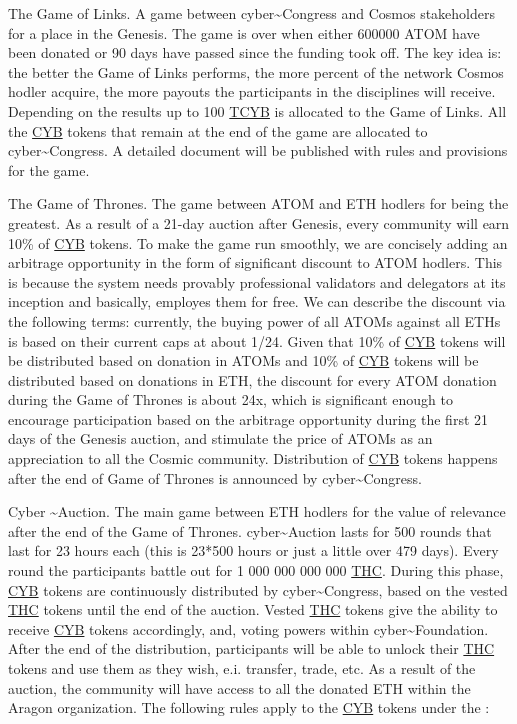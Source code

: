 \documentclass[8pt,oneside]{amsart}
\newcommand{\linkgreen}[2]{\href{#1}{\color{green}{#2}}}
\begin{document}
The Game of Links. A game between cyber\~{}Congress and Cosmos stakeholders for a place in the Genesis. The game is over when either 600000 ATOM have been donated or 90 days have passed since the funding took off. The key idea is: the better the Game of Links performs, the more percent of the network Cosmos hodler acquire, the more payouts the participants in the disciplines will receive. Depending on the results up to 100 {\hyperref[cyb]{TCYB}} is allocated to the Game of Links. All the {\hyperref[cyb]{CYB}} tokens that remain at the end of the game are allocated to cyber\~{}Congress. A detailed document will be published with rules and provisions for the game.

The Game of Thrones. The game between ATOM and ETH hodlers for being the greatest. As a result of a 21-day auction after Genesis, every community will earn 10\% of {\hyperref[cyb]{CYB}} tokens. To make the game run smoothly, we are concisely adding an arbitrage opportunity in the form of significant discount to ATOM hodlers. This is because the system needs provably professional validators and delegators at its inception and basically, employes them for free. We can describe the discount via the following terms: currently, the buying power of all ATOMs against all ETHs is based on their current caps at about 1/24. Given that 10\% of {\hyperref[cyb]{CYB}} tokens will be distributed based on donation in ATOMs and 10\% of {\hyperref[cyb]{CYB}} tokens will be distributed based on donations in ETH, the discount for every ATOM donation during the Game of Thrones is about 24x, which is significant enough to encourage participation based on the arbitrage opportunity during the first 21 days of the Genesis auction, and stimulate the price of ATOMs as an appreciation to all the Cosmic community. Distribution of {\hyperref[cyb]{CYB}} tokens happens after the end of Game of Thrones is announced by cyber\~{}Congress.

Cyber \~{}Auction. The main game between ETH hodlers for the value of relevance after the end of the Game of Thrones. cyber\~{}Auction lasts for 500 rounds that last for 23 hours each (this is 23*500 hours or just a little over 479 days). Every round the participants battle out for 1 000 000 000 000 {\hyperref[thc]{THC}}. During this phase, {\hyperref[cyb]{CYB}} tokens are continuously distributed by cyber\~{}Congress, based on the vested {\hyperref[thc]{THC}} tokens until the end of the auction. Vested {\hyperref[thc]{THC}} tokens give the ability to receive {\hyperref[cyb]{CYB}} tokens accordingly, and, voting powers within cyber\~{}Foundation. After the end of the distribution, participants will be able to unlock their {\hyperref[thc]{THC}} tokens and use them as they wish, e.i. transfer, trade, etc. As a result of the auction, the community will have access to all the donated ETH within the Aragon organization. The following rules apply to the {\hyperref[cyb]{CYB}} tokens under the \linkgreen{https://cyberd.ai/account/cyber12v6jzx9vea277aqj0nffll8ewvme35w94yv258}{multisig for distribution}:
\end{document}
